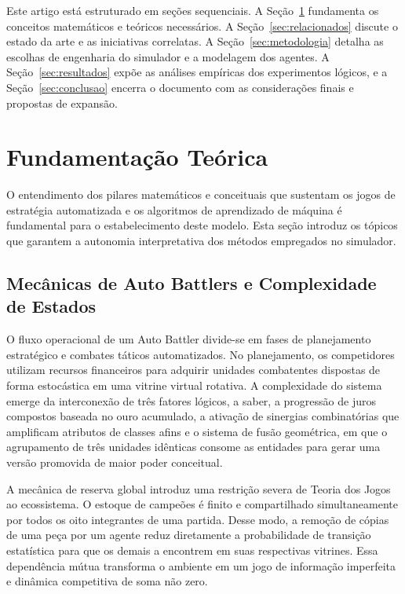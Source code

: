 \documentclass[12pt]{article}
\begin{document}
Este artigo está estruturado em seções sequenciais. A Seção~\ref{sec:referencial} fundamenta os conceitos matemáticos e teóricos necessários. A Seção~\ref{sec:relacionados} discute o estado da arte e as iniciativas correlatas. A Seção~\ref{sec:metodologia} detalha as escolhas de engenharia do simulador e a modelagem dos agentes. A Seção~\ref{sec:resultados} expõe as análises empíricas dos experimentos lógicos, e a Seção~\ref{sec:conclusao} encerra o documento com as considerações finais e propostas de expansão.

\section{Fundamentação Teórica} \label{sec:referencial}

O entendimento dos pilares matemáticos e conceituais que sustentam os jogos de estratégia automatizada e os algoritmos de aprendizado de máquina é fundamental para o estabelecimento deste modelo. Esta seção introduz os tópicos que garantem a autonomia interpretativa dos métodos empregados no simulador.

\subsection{Mecânicas de Auto Battlers e Complexidade de Estados}
O fluxo operacional de um Auto Battler divide-se em fases de planejamento estratégico e combates táticos automatizados. No planejamento, os competidores utilizam recursos financeiros para adquirir unidades combatentes dispostas de forma estocástica em uma vitrine virtual rotativa. A complexidade do sistema emerge da interconexão de três fatores lógicos, a saber, a progressão de juros compostos baseada no ouro acumulado, a ativação de sinergias combinatórias que amplificam atributos de classes afins e o sistema de fusão geométrica, em que o agrupamento de três unidades idênticas consome as entidades para gerar uma versão promovida de maior poder conceitual.

A mecânica de reserva global introduz uma restrição severa de Teoria dos Jogos ao ecossistema. O estoque de campeões é finito e compartilhado simultaneamente por todos os oito integrantes de uma partida. Desse modo, a remoção de cópias de uma peça por um agente reduz diretamente a probabilidade de transição estatística para que os demais a encontrem em suas respectivas vitrines. Essa dependência mútua transforma o ambiente em um jogo de informação imperfeita e dinâmica competitiva de soma não zero.
\end{document}
